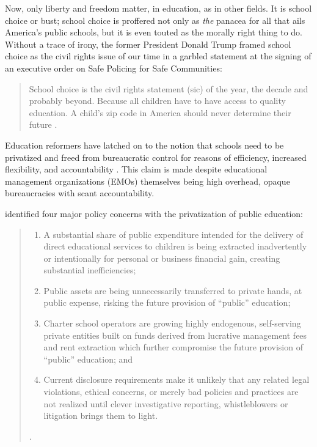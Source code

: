 Now, only liberty and freedom matter, in education, as in other fields. It is school choice or bust; school choice is proffered not only as \textit{the} panacea for all that ails America's public schools, but it is even touted as the morally right thing to do. Without a  trace of irony, the former President Donald Trump framed school choice as the civil rights issue of our time in a garbled statement at the signing of an executive order on Safe Policing for Safe Communities:
\begin{quote}\noindent
School choice is the civil rights statement (sic) of the year, the decade and probably beyond. Because all children have to have access to quality education. A child’s zip code in America should never determine their future \parencite[as quoted in][]{Lennox2020}.
\end{quote} 

Education reformers have latched on to the notion that schools need to be privatized and freed from bureaucratic control for reasons of efficiency, increased flexibility, and accountability \parencite{Garcia2018}. This claim is made despite educational management organizations (EMOs) themselves being high overhead, opaque bureaucracies with scant accountability.

\citeauthor{Baker.Miron2015} identified four major policy concerns with the privatization of public education:
\begin{quotation}\noindent
\vspace{-1\baselineskip}\begin{enumerate}
    \item A substantial share of public expenditure intended for the delivery of direct educational services to children is being extracted inadvertently or intentionally for personal or business financial gain, creating substantial inefficiencies;
    \item Public assets are being unnecessarily transferred to private hands, at public expense, risking the future provision of “public” education;
    \item Charter school operators are growing highly endogenous, self-serving private entities built on funds derived from lucrative management fees and rent extraction which further compromise the future provision of “public” education; and
    \item Current disclosure requirements make it unlikely that any related legal violations, ethical concerns, or merely bad policies and practices are not realized until clever investigative reporting, whistleblowers or litigation brings them to light.
  \end{enumerate} \parencite[3]{Baker.Miron2015}.
\end{quotation}

